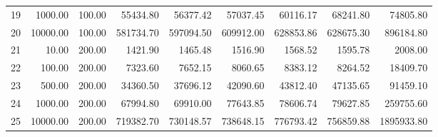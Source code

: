 \begin{table}[ht]
\begin{tabular}{rrrrrrrrr}
  19 & 1000.00 & 100.00 & 55434.80 & 56377.42 & 57037.45 & 60116.17 & 68241.80 & 74805.80 \\ 
  20 & 10000.00 & 100.00 & 581734.70 & 597094.50 & 609912.00 & 628853.86 & 628675.30 & 896184.80 \\ 
  21 & 10.00 & 200.00 & 1421.90 & 1465.48 & 1516.90 & 1568.52 & 1595.78 & 2008.00 \\ 
  22 & 100.00 & 200.00 & 7323.60 & 7652.15 & 8060.65 & 8383.12 & 8264.52 & 18409.70 \\ 
  23 & 500.00 & 200.00 & 34360.50 & 37696.12 & 42090.60 & 43812.40 & 47135.65 & 91459.10 \\ 
  24 & 1000.00 & 200.00 & 67994.80 & 69910.00 & 77643.85 & 78606.74 & 79627.85 & 259755.60 \\ 
  25 & 10000.00 & 200.00 & 719382.70 & 730148.57 & 738648.15 & 776793.42 & 756859.88 & 1895933.80 \\ 
   \hline
\end{tabular}
\end{table}
